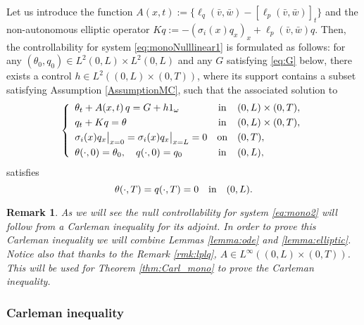 \documentclass[10pt]{article}
\newtheorem{rmq}{Remark}
\def\dis{\displaystyle}
\def\\Phivec{\mathbf{\Phi}}
\begin{document}
    Let us introduce the function $A(x,t):=\{\ell_q(\bar v,\bar w)-[\ell_p(\bar v,\bar w)]_t\}$ and the non-autonomous
    elliptic operator $Kq:=-(\sigma_i(x)q_x)_x+\ell_p(\bar v,\bar w)q$. Then, the controllability for system \eqref{eq:monoNulllinear1}
    is formulated as follows: for any $(\theta_0,q_0)\in L^2(0,L)\times L^2(0,L)$ and any $G$ satisfying \eqref{eq:G} below,
    there exists a control $h\in L^2((0,L)\times(0,T))$, where its support contains a subset %
    satisfying Assumption \ref{AssumptionMC}, such that the
    associated solution to
\begin{equation}\label{eq:mono2}
    \left\{
        \begin{array}{lcl}
            \theta_t  + A(x,t)\,q= G+ h1_{\omega}         & \mbox{in}&    (0,L) \times (0,T),        \\
            \noalign{\smallskip}\dis
            q_t+Kq  =  \theta                    & \mbox{in}&    (0,L) \times (0,T),        \\
            \noalign{\smallskip}\dis
            \sigma_i(x)q_{x}\big|_{x=0}=\sigma_i(x)q_{x}\big|_{x=L} = 0                & \mbox{on}&     (0,T),    \\
            \noalign{\smallskip}\dis
            \theta(\cdot,0) =\theta_0,\quad q(\cdot,0) =q_0 & \mbox{in}&    (0,L),
        \end{array}
    \right.
\end{equation}
 satisfies
 $$
     \theta(\cdot,T) =q(\cdot,T)=0\quad \hbox{in}\quad (0,L).
 $$

\begin{rmq}\label{rmq_A}
	{ As we will see the null controllability for system \eqref{eq:mono2} will follow from a  Carleman inequality for its
	adjoint. In order to prove this  Carleman inequality we will combine Lemmas \ref{lemma:ode} and \ref{lemma:elliptic}. Notice also that  thanks to the Remark \ref{rmk:lplq}, $A\in L^\infty((0,L)\times(0,T))$. This will be  used for Theorem \ref{thm:Carl_mono} to 
	prove the Carleman inequality.}
\end{rmq}



\subsubsection{Carleman inequality}\label{Carleman}
\end{document}
